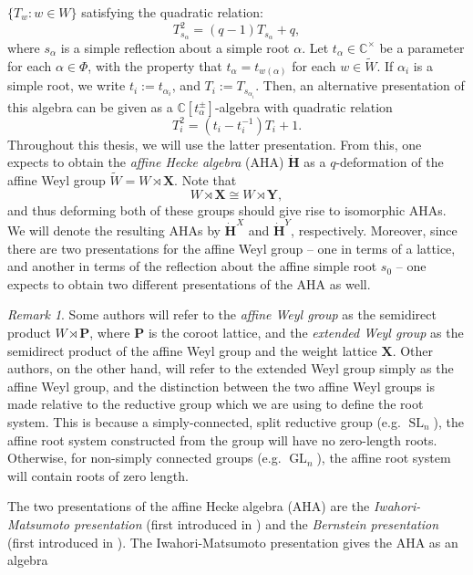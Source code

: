 \documentclass[a4paper]{report}
\theoremstyle{theorem}
\theoremstyle{definition}
\theoremstyle{remark}
\newtheorem{remark}{Remark}
\theoremstyle{proposition}
\theoremstyle{conjecture}
\theoremstyle{lemma}
\theoremstyle{corollary}
\theoremstyle{exercise}
\theoremstyle{example}
\newcommand{\C}{\mathbb{C}}
\newcommand{\on}{\operatorname}
\begin{document}
  $\lbrace T_w : w\in W \rbrace$ satisfying the quadratic relation:
  $$T_{s_\alpha}^2 = (q-1)T_{s_\alpha} + q,$$
  where $s_\alpha$ is a simple reflection about a simple root $\alpha$. 
  Let $t_\alpha \in \C^\times$ be a parameter for each $\alpha \in \Phi$,
  with the property that $t_\alpha = t_{w(\alpha)}$ for each 
  $w\in \widetilde{W}$.
  If $\alpha_i$ is a simple root, we write $t_i := t_{\alpha_i}$, and $T_i := T_{s_{\alpha_i}}$.
  Then, an alternative presentation of this algebra can be given as a 
  $\C[t_\alpha^\pm]$-algebra with quadratic relation 
  $$T_i^2 = (t_i-t_i^{-1})T_i + 1.$$
  Throughout this thesis, we will use the latter presentation. 
  From this, one expects to obtain the \emph{affine Hecke algebra} (AHA) $\mathbf{\dot{H}}$
  as a $q$-deformation of the affine Weyl group $\widetilde{W} = W \rtimes \mathbf{X}$. 
  Note that $$W \rtimes \mathbf{X} \cong W \rtimes \mathbf{Y},$$
  and thus deforming both of these groups should give rise to isomorphic AHAs. We will
  denote the resulting AHAs by $\mathbf{\dot{H}}^X$ and $\mathbf{\dot{H}}^Y$,
  respectively. Moreover, since there are two presentations for the affine Weyl group -- one in terms 
  of a lattice, and another in terms of the reflection about the affine simple root $s_0$ -- one 
  expects to obtain two different presentations of the AHA as well.
  \begin{remark}
      Some authors will refer to the \emph{affine Weyl group} as the semidirect product 
      $W \rtimes \mathbf{P}$, where $\mathbf{P}$ is the coroot lattice, and the
      \emph{extended Weyl group} as the semidirect product of the affine Weyl group and the 
      weight lattice $\mathbf{X}$. 
      Other authors, on the other hand, will refer to the extended Weyl group 
      simply as the affine Weyl group, and the distinction between the two affine
      Weyl groups is made relative to the reductive group which we are using to define the root
      system. This is because a simply-connected, split reductive group (e.g. $\on{SL}_n$), 
      the affine root system constructed from the group will have no zero-length roots. 
      Otherwise, for non-simply connected groups (e.g. $\on{GL}_n$), the affine root system will 
      contain roots of zero length.
  \end{remark}
  The two presentations of the affine Hecke algebra (AHA) are the \emph{Iwahori-Matsumoto presentation} (first introduced in \cite[Theorem 2.24]{im65})
  and the \emph{Bernstein presentation} (first introduced in \cite{lus83}). The Iwahori-Matsumoto presentation gives the AHA as an algebra
\end{document}
